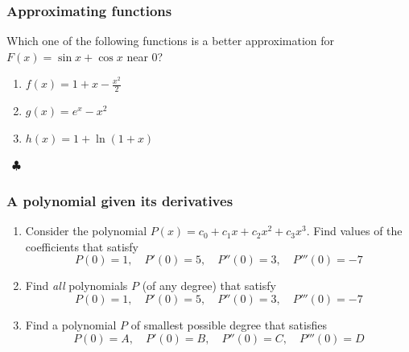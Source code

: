 \documentclass[14pt]{beamer}
\begin{document}
\begin{frame}[t]
	\frametitle{Approximating functions }

	Which one of the following functions is a better approximation for \;
	$\displaystyle F(x) = \sin x + \cos x$ \; near 0?
	\vspace{.2cm}
	\begin{enumerate}
		\item $\displaystyle f(x) = 1 + x - \frac{x^{2}}{2}$
			\vspace{.2cm}

		\item $\displaystyle g(x) = e^{x}-x^{2}$
			\vspace{.2cm}

		\item $\displaystyle h(x) = 1 + \ln (1+x)$
	\end{enumerate}

	\ \hfill \href{https://www.desmos.com/calculator/1hqedw17c8}{$\clubsuit$}
\end{frame}

\begin{frame}[t]
	\fontsize{13}{13}\selectfont
	\frametitle{A polynomial given its derivatives}

	\begin{enumerate}
		\item Consider the polynomial $\displaystyle P(x)= c_{0}+ c_{1}x + c_{2}x^{2}
			+ c_{3}x^{3}$. Find values of the coefficients that satisfy
			\[
				P(0) = 1, \quad P'(0) = 5, \quad P''(0) = 3, \quad P'''(0) = -7
			\]

		\item Find \emph{all} polynomials $P$ (of any degree) that satisfy
			\[
				P(0) = 1, \quad P'(0) = 5, \quad P''(0) = 3, \quad P'''(0) = -7
			\]

		\item Find a polynomial $P$ of smallest possible degree that satisfies
			\[
				P(0) = A, \quad P'(0) = B, \quad P''(0) = C, \quad P'''(0) = D
			\]
	\end{enumerate}
\end{frame}
\end{document}
